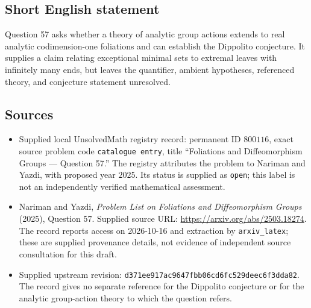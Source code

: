 \documentclass[11pt]{article}
\begin{document}
\subsection{Short English statement}
Question 57 asks whether a theory of analytic group actions extends to real analytic codimension-one foliations and can establish the Dippolito conjecture. It supplies a claim relating exceptional minimal sets to extremal leaves with infinitely many ends, but leaves the quantifier, ambient hypotheses, referenced theory, and conjecture statement unresolved.
\subsection{Sources}
\begin{itemize}
\item Supplied local UnsolvedMath registry record: permanent ID \(800116\), exact source problem code \texttt{catalogue entry}, title ``Foliations and Diffeomorphism Groups --- Question 57.'' The registry attributes the problem to Nariman and Yazdi, with proposed year \(2025\). Its status is supplied as \texttt{open}; this label is not an independently verified mathematical assessment.
\item Nariman and Yazdi, \emph{Problem List on Foliations and Diffeomorphism Groups} (2025), Question 57. Supplied source URL: \url{https://arxiv.org/abs/2503.18274}. The record reports access on 2026-10-16 and extraction by \texttt{arxiv\_latex}; these are supplied provenance details, not evidence of independent source consultation for this draft.
\item Supplied upstream revision: \texttt{d371ee917ac9647fbb06cd6fc529deec6f3dda82}. The record gives no separate reference for the Dippolito conjecture or for the analytic group-action theory to which the question refers.
\end{itemize}
\end{document}
